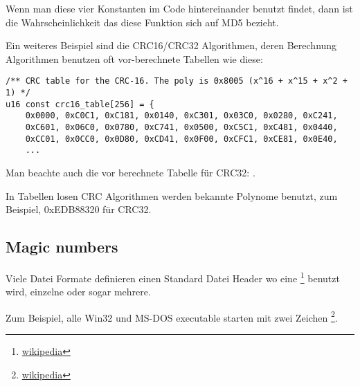 Wenn man diese vier Konstanten im Code hintereinander benutzt findet, dann ist die Wahrscheinlichkeit das diese Funktion 
sich auf MD5 bezieht.

\par Ein weiteres Beispiel sind die CRC16/CRC32 Algorithmen,
deren Berechnung Algorithmen benutzen oft vor-berechnete Tabellen wie diese:

\begin{lstlisting}[caption=linux/lib/crc16.c,style=customc]
/** CRC table for the CRC-16. The poly is 0x8005 (x^16 + x^15 + x^2 + 1) */
u16 const crc16_table[256] = {
	0x0000, 0xC0C1, 0xC181, 0x0140, 0xC301, 0x03C0, 0x0280, 0xC241,
	0xC601, 0x06C0, 0x0780, 0xC741, 0x0500, 0xC5C1, 0xC481, 0x0440,
	0xCC01, 0x0CC0, 0x0D80, 0xCD41, 0x0F00, 0xCFC1, 0xCE81, 0x0E40,
	...
\end{lstlisting}

Man beachte auch die vor berechnete Tabelle für CRC32: .

In Tabellen losen CRC Algorithmen werden bekannte Polynome benutzt, zum Beispiel, 0xEDB88320 für CRC32.

\subsection{Magic numbers}
\label{magic_numbers}

\newcommand{\FNURLMAGIC}{\footnote{\href{http://go.yurichev.com/17112}{wikipedia}}}

Viele Datei Formate definieren einen Standard Datei Header wo eine \FNURLMAGIC{} benutzt wird, einzelne oder
sogar mehrere. 


Zum Beispiel, alle Win32 und MS-DOS executable starten mit zwei Zeichen \footnote{\href{http://go.yurichev.com/17113}{wikipedia}}.

